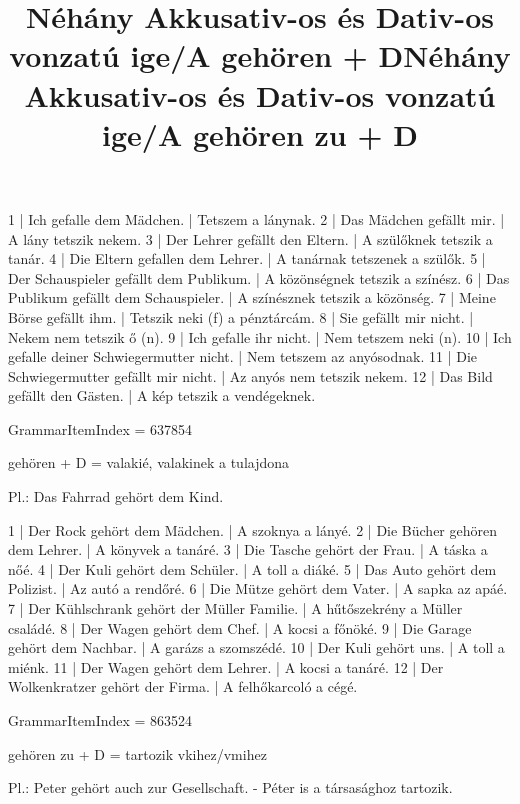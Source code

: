 \begin{exmp}
1 | Ich gefalle dem Mädchen. | Tetszem a lánynak.
2 | Das Mädchen gefällt mir. | A lány tetszik nekem.
3 | Der Lehrer gefällt den Eltern. | A szülőknek tetszik a tanár.
4 | Die Eltern gefallen dem Lehrer. | A tanárnak tetszenek a szülők.
5 | Der Schauspieler gefällt dem Publikum. | A közönségnek tetszik a színész.
6 | Das Publikum gefällt dem Schauspieler. | A színésznek tetszik a közönség.
7 | Meine Börse gefällt ihm. | Tetszik neki (f) a pénztárcám.
8 | Sie gefällt mir nicht. | Nekem nem tetszik ő (n).
9 | Ich gefalle ihr nicht. | Nem tetszem neki (n).
10 | Ich gefalle deiner Schwiegermutter nicht. | Nem tetszem az anyósodnak.
11 | Die Schwiegermutter gefällt mir nicht. | Az anyós nem tetszik nekem.
12 | Das Bild gefällt den Gästen. | A kép tetszik a vendégeknek.
\end{exmp}

\title{Néhány Akkusativ-os és Dativ-os vonzatú ige/A gehören + D}

GrammarItemIndex = 637854

\begin{desc}
gehören + D = valakié, valakinek a tulajdona

Pl.: Das Fahrrad gehört dem Kind.
\end{desc}

\begin{exmp}
1 | Der Rock gehört dem Mädchen. | A szoknya a lányé.
2 | Die Bücher gehören dem Lehrer. | A könyvek a tanáré.
3 | Die Tasche gehört der Frau. | A táska a nőé.
4 | Der Kuli gehört dem Schüler. | A toll a diáké.
5 | Das Auto gehört dem Polizist. | Az autó a rendőré.
6 | Die Mütze gehört dem Vater. | A sapka az apáé.
7 | Der Kühlschrank gehört der Müller Familie. | A hűtőszekrény a Müller családé.
8 | Der Wagen gehört dem Chef. | A kocsi a főnöké.
9 | Die Garage gehört dem Nachbar. | A garázs a szomszédé.
10 | Der Kuli gehört uns. | A toll a miénk.
11 | Der Wagen gehört dem Lehrer. | A kocsi a tanáré.
12 | Der Wolkenkratzer gehört der Firma. | A felhőkarcoló a cégé.
\end{exmp}

\title{Néhány Akkusativ-os és Dativ-os vonzatú ige/A gehören zu + D}

GrammarItemIndex = 863524

\begin{desc}
gehören zu + D = tartozik vkihez/vmihez

Pl.: Peter gehört auch zur Gesellschaft. - Péter is a társasághoz tartozik.
\end{desc}

